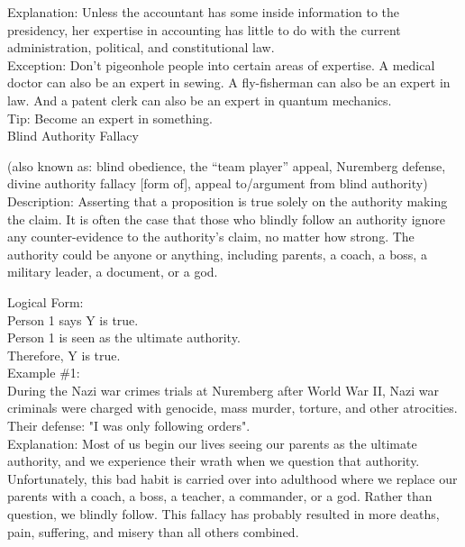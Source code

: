 \documentclass[a4paper,12pt,single,pdftex]{scrartcl}
\begin{document}
    
      Explanation: Unless the accountant has some inside information to the presidency, her expertise in accounting has little to do with the current administration, political, and constitutional law.
    \\

    
      Exception: Don't pigeonhole people into certain areas of expertise. A medical doctor can also be an expert in sewing. A fly-fisherman can also be an expert in law. And a patent clerk can also be an expert in quantum mechanics.
    \\

    
      Tip: Become an expert in something.
    \\

  

Blind Authority Fallacy
    
      (also known as: blind obedience, the “team player” appeal, Nuremberg defense, divine authority fallacy [form of], appeal to/argument from blind authority)
    \\

  
    Description: Asserting that a proposition is true solely on the authority making the claim. It is often the case that those who blindly follow an authority ignore any counter-evidence to the authority’s claim, no matter how strong. The authority could be anyone or anything, including parents, a coach, a boss, a military leader, a document, or a god.

    
      Logical Form:
    \\

    
      Person 1 says Y is true.
    \\

    
      Person 1 is seen as the ultimate authority.
    \\

    
      Therefore, Y is true.
    \\

    
      Example \#1:
    \\

    
      During the Nazi war crimes trials at Nuremberg after World War II,  Nazi war criminals were charged with genocide, mass murder, torture, and other atrocities.  Their defense: "I was only following orders".
    \\

    
      Explanation: Most of us begin our lives seeing our parents as the ultimate authority, and we experience their wrath when we question that authority.  Unfortunately, this bad habit is carried over into adulthood where we replace our parents with a coach, a boss, a teacher, a commander, or a god.  Rather than question, we blindly follow.  This fallacy has probably resulted in more deaths, pain, suffering, and misery than all others combined.
    \\
\end{document}
